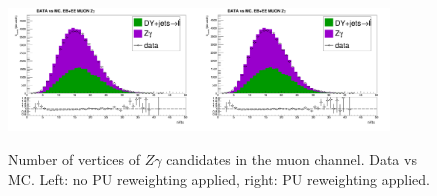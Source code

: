 \begin{figure}[htb]
  \begin{center}
   \includegraphics[width=0.45\textwidth]{../figs/figs_v11/MUON_ZGamma/PrepareYields/c_TotalDATAvsMC_EtaCommon__nVtx_noPU.png}\includegraphics[width=0.45\textwidth]{../figs/figs_v11/MUON_ZGamma/PrepareYields/c_TotalDATAvsMC_EtaCommon__nVtx.png}
  \caption{Number of vertices of $Z\gamma$ candidates in the muon channel. Data vs MC. Left: no PU reweighting applied, right: PU reweighting applied. }
  \label{fig:DATAvsMC_nVtx}
  \end{center}
\end{figure}
